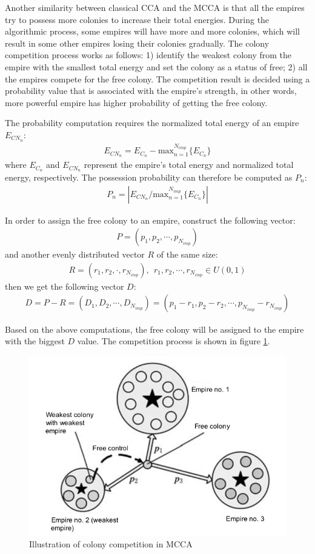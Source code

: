 Another similarity between classical CCA and the MCCA is that all the empires try to possess more colonies to increase their total energies.
During the algorithmic process, some empires will have more and more colonies, which will result in some other empires losing their colonies gradually.
The colony competition process works as follows: 1) identify the weakest colony from the empire with the smallest total energy and set the colony as a status of free; 2) all the empires compete for the free colony.
The competition result is decided using a probability value that is associated with the empire's strength, in other words, more powerful empire has higher probability of getting the free colony.

The probability computation requires the normalized total energy of an empire $E_{CN_n}$: 
\begin{align}
	E_{CN_n} = E_{C_n} - \text{max}_{n = 1}^{N_{imp}}\{E_{C_n}\}
\end{align}
where $E_{C_n}$ and $E_{CN_n}$ represent the empire's total energy and normalized total energy, respectively.
The possession probability can therefore be computed as $P_n$:
\begin{align}
	P_n = |E_{CN_n}/\text{max}_{n = 1}^{N_{imp}}\{E_{C_n}\}|
\end{align}

In order to assign the free colony to an empire, construct the following vector:
\begin{align}
	P = (p_1, p_2, \cdots, p_{N_{imp}})
\end{align}
and another evenly distributed vector $R$ of the same size:
\begin{align}
	R = (r_1, r_2, \cdot, r_{N_{imp}}), \ \ r_1, r_2, \cdots, r_{N_{imp}} \in U(0, 1)
\end{align}
then we get the following vector $D$:
\begin{align}
	D = P-R 
	= (D_1, D_2, \cdots, D_{N_{imp}}) 
	= (p_1 - r_1, p_2 - r_2, \cdots, p_{N_{imp}} - r_{N_{imp}})
\end{align}

Based on the above computations, the free colony will be assigned to the empire with the biggest $D$ value.
The competition process is shown in figure \ref{fig:fig2}.

\begin{figure}[h!]
	\begin{center}
		\includegraphics[width=0.5\linewidth]{sections/figure2.jpg}
		\caption{Illustration of colony competition in MCCA}
		\label{fig:fig2}
	\end{center}
\end{figure}

